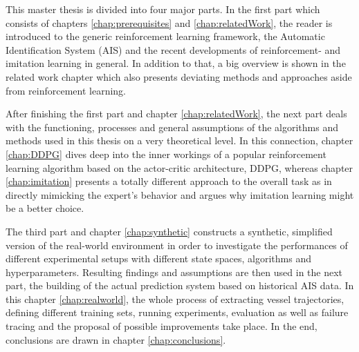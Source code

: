 This master thesis is divided into four major parts. In the first part which consists of chapters \ref{chap:prerequisites} and \ref{chap:relatedWork}, the reader is introduced to the generic reinforcement learning framework, the Automatic Identification System (AIS) and the recent developments of reinforcement- and imitation learning in general. In addition to that, a big overview is shown in the related work chapter which also presents deviating methods and approaches aside from reinforcement learning.
\par
After finishing the first part and chapter \ref{chap:relatedWork}, the next part deals with the functioning, processes and general assumptions of the algorithms and methods used in this thesis on a very theoretical level. In this connection, chapter \ref{chap:DDPG} dives deep into the inner workings of a popular reinforcement learning algorithm based on the actor-critic architecture, DDPG, whereas chapter \ref{chap:imitation} presents a totally different approach to the overall task as in directly mimicking the expert's behavior and argues why imitation learning might be a better choice.
\par
The third part and chapter \ref{chap:synthetic} constructs a synthetic, simplified version of the real-world environment in order to investigate the performances of different experimental setups with different state spaces, algorithms and hyperparameters. Resulting findings and assumptions are then used in the next part, the building of the actual prediction system based on historical AIS data. In this chapter \ref{chap:realworld}, the whole process of extracting vessel trajectories, defining different training sets, running experiments, evaluation as well as failure tracing and the proposal of possible improvements take place. In the end, conclusions are drawn in chapter \ref{chap:conclusions}.